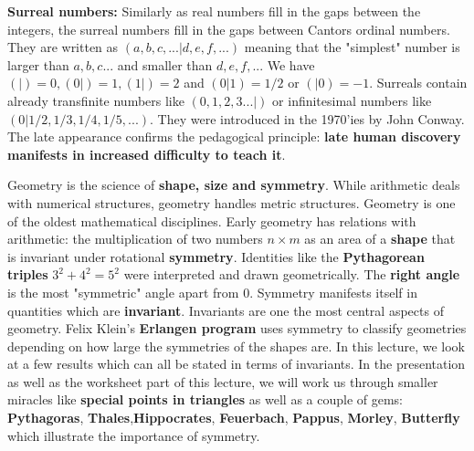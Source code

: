 \documentclass[12pt]{amsart}
\def\chapter#1{ \vspace{2mm} \begin{center} \fcolorbox{green1}{green1}{ \parbox{16.2cm}{{\Large {\bf #1}}}} \vspace{2mm} \end{center} }
\newcounter{example}    \def\example#1{ \item \fontsize{12}{15} \selectfont #1 \fontsize{12}{15} \selectfont }
\begin{document}
{\bf Surreal numbers:}
Similarly as real numbers fill in the gaps between the integers, the surreal numbers fill in the 
gaps between Cantors ordinal numbers. They are written as $( a,b,c,...| d,e,f ,... )$
meaning that the "simplest" number is larger than $a,b,c...$ and smaller than $d,e,f,..$. 
We have $(|)=0, (0|)=1, (1|)=2$ and $(0|1)=1/2$ or $(|0)=-1$. Surreals contain already transfinite 
numbers like $(0,1,2,3...|)$ or infinitesimal numbers like $(0|1/2,1/3,1/4,1/5,...)$. They 
were introduced in the 1970'ies by John Conway. The late appearance
confirms the pedagogical principle: {\bf late human discovery manifests in increased difficulty to teach it}.

 \pagebreak
{}

\chapter{Lecture 3: Geometry}

Geometry is the science of {\bf shape, size and symmetry}. 
While arithmetic deals with numerical structures, geometry handles 
metric structures.  Geometry is one of the oldest mathematical 
disciplines. Early geometry has relations with arithmetic: 
the multiplication of two numbers $n \times m$ as an area of a
{\bf shape} that is invariant under rotational {\bf symmetry}. 
Identities like the {\bf Pythagorean triples} $3^2+4^2=5^2$ 
were interpreted and drawn geometrically. The {\bf right angle} is 
the most "symmetric" angle apart from $0$.
Symmetry manifests itself in quantities which are {\bf invariant}. 
Invariants are one the most central aspects of geometry. 
Felix Klein's {\bf Erlangen program} uses symmetry to classify 
geometries depending on how large the symmetries of the shapes are. 
In this lecture, we look at a few results which can all be stated 
in terms of invariants. 
In the presentation as well as the worksheet part of this lecture, 
we will work us through smaller miracles like
{\bf special points in triangles} as well as a couple of gems:
{\bf Pythagoras}, {\bf Thales},{\bf Hippocrates}, {\bf Feuerbach}, {\bf Pappus}, {\bf Morley},
{\bf Butterfly} which illustrate the importance of symmetry. \\
\end{document}
